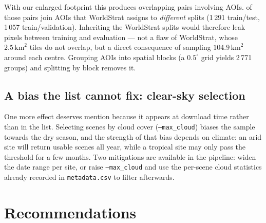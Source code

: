 \documentclass[11pt,a4paper]{article}
\begin{document}
With our enlarged footprint this produces \OverlapPairs{} overlapping pairs involving
\OverlapSites{} AOIs. \CrossSplitPairs{} of those pairs join AOIs that WorldStrat assigns to
\emph{different} splits (1\,291 train/test, 1\,057 train/validation). Inheriting the WorldStrat
splits would therefore leak pixels between training and evaluation --- not a flaw of WorldStrat,
whose $2.5\,\mathrm{km}^2$ tiles do not overlap, but a direct consequence of sampling
$104.9\,\mathrm{km}^2$ around each centre. Grouping AOIs into spatial blocks (a $0.5^\circ$
grid yields 2\,771 groups) and splitting by block removes it.

\subsection{A bias the list cannot fix: clear-sky selection}

One more effect deserves mention because it appears at download time rather than in the list.
Selecting scenes by cloud cover (\texttt{--max\_cloud}) biases the sample towards the dry season,
and the strength of that bias depends on climate: an arid site will return usable scenes all
year, while a tropical site may only pass the threshold for a few months. Two mitigations are
available in the pipeline: widen the date range per site, or raise \texttt{--max\_cloud} and use
the per-scene cloud statistics already recorded in \texttt{metadata.csv} to filter afterwards.

\section{Recommendations}
\end{document}

